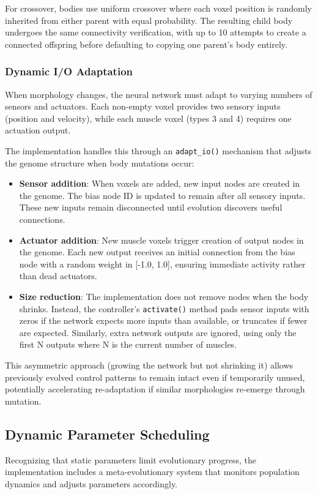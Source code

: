 \documentclass[conference]{IEEEtran}
\begin{document}
For crossover, bodies use uniform crossover where each voxel position is randomly inherited from either parent with equal probability. The resulting child body undergoes the same connectivity verification, with up to 10 attempts to create a connected offspring before defaulting to copying one parent's body entirely.

\subsubsection{Dynamic I/O Adaptation}
When morphology changes, the neural network must adapt to varying numbers of sensors and actuators. Each non-empty voxel provides two sensory inputs (position and velocity), while each muscle voxel (types 3 and 4) requires one actuation output.

The implementation handles this through an \texttt{adapt\_io()} mechanism that adjusts the genome structure when body mutations occur:
\begin{itemize}
    \item \textbf{Sensor addition}: When voxels are added, new input nodes are created in the genome. The bias node ID is updated to remain after all sensory inputs. These new inputs remain disconnected until evolution discovers useful connections.
    \item \textbf{Actuator addition}: New muscle voxels trigger creation of output nodes in the genome. Each new output receives an initial connection from the bias node with a random weight in [-1.0, 1.0], ensuring immediate activity rather than dead actuators.
    \item \textbf{Size reduction}: The implementation does not remove nodes when the body shrinks. Instead, the controller's \texttt{activate()} method pads sensor inputs with zeros if the network expects more inputs than available, or truncates if fewer are expected. Similarly, extra network outputs are ignored, using only the first N outputs where N is the current number of muscles.
\end{itemize}

This asymmetric approach (growing the network but not shrinking it) allows previously evolved control patterns to remain intact even if temporarily unused, potentially accelerating re-adaptation if similar morphologies re-emerge through mutation.

\subsection{Dynamic Parameter Scheduling}
Recognizing that static parameters limit evolutionary progress, the implementation includes a meta-evolutionary system that monitors population dynamics and adjusts parameters accordingly.
\end{document}
